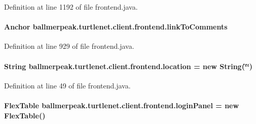 Definition at line 1192 of file frontend.\-java.

\hypertarget{classballmerpeak_1_1turtlenet_1_1client_1_1frontend_a1dc4e0c879ec185e39c9df33f96b99d6}{
\paragraph[{link\-To\-Comments}]{\setlength{\rightskip}{0pt plus 5cm}Anchor ballmerpeak.\-turtlenet.\-client.\-frontend.\-link\-To\-Comments\hspace{0.3cm}{\ttfamily [private]}}}\label{classballmerpeak_1_1turtlenet_1_1client_1_1frontend_a1dc4e0c879ec185e39c9df33f96b99d6}


Definition at line 929 of file frontend.\-java.

\hypertarget{classballmerpeak_1_1turtlenet_1_1client_1_1frontend_a7d6f7af35b97248a4c87681b56b247b6}{
\paragraph[{location}]{\setlength{\rightskip}{0pt plus 5cm}String ballmerpeak.\-turtlenet.\-client.\-frontend.\-location = new String(\char`\"{}\char`\"{})\hspace{0.3cm}{\ttfamily [private]}}}\label{classballmerpeak_1_1turtlenet_1_1client_1_1frontend_a7d6f7af35b97248a4c87681b56b247b6}


Definition at line 49 of file frontend.\-java.

\hypertarget{classballmerpeak_1_1turtlenet_1_1client_1_1frontend_a8991d2d9a0c72e08986aa710d0e02278}{
\paragraph[{login\-Panel}]{\setlength{\rightskip}{0pt plus 5cm}Flex\-Table ballmerpeak.\-turtlenet.\-client.\-frontend.\-login\-Panel = new Flex\-Table()\hspace{0.3cm}{\ttfamily [private]}}}\label{classballmerpeak_1_1turtlenet_1_1client_1_1frontend_a8991d2d9a0c72e08986aa710d0e02278}


